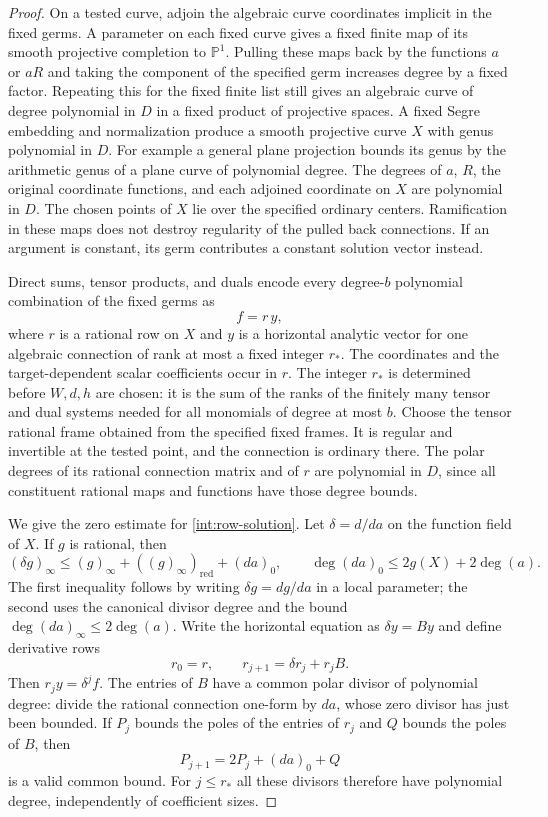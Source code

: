 \begin{proof}
On a tested curve, adjoin the algebraic curve coordinates implicit in
the fixed germs.  A parameter on each fixed curve gives a fixed finite
map of its smooth projective completion to $\mathbb P^1$.  Pulling
these maps back by the functions $a$ or $aR$ and taking the component
of the specified germ increases degree by a fixed factor.  Repeating
this for the fixed finite list still gives an algebraic curve of degree
polynomial in $D$ in a fixed product of projective spaces.  A fixed
Segre embedding and normalization produce a smooth projective curve
$X$ with genus polynomial in $D$.  For example a general plane
projection bounds its genus by the arithmetic genus of a plane curve
of polynomial degree.  The degrees of $a$, $R$, the original coordinate
functions, and each adjoined coordinate on $X$ are polynomial in $D$.
The chosen points of $X$ lie over the specified ordinary centers.
Ramification in these maps does not destroy regularity of the pulled
back connections.  If an argument is constant, its germ contributes
a constant solution vector instead.

Direct sums, tensor products, and duals encode every degree-$b$
polynomial combination of the fixed germs as
\begin{equation}\label{int:row-solution}
 f=r\,y,
\end{equation}
where $r$ is a rational row on $X$ and $y$ is a horizontal analytic
vector for one algebraic connection of rank at most a fixed integer
$r_*$.  The coordinates and the target-dependent scalar coefficients
occur in $r$.  The integer $r_*$ is determined before $W,d,h$ are chosen:
it is the sum of the ranks of the finitely many tensor and dual systems
needed for all monomials of degree at most $b$.  Choose the tensor
rational frame obtained from the specified fixed frames.  It is regular
and invertible at the tested point, and the connection is ordinary
there.  The polar degrees of its rational connection matrix and of $r$
are polynomial in $D$, since all constituent rational maps and
functions have those degree bounds.

We give the zero estimate for \eqref{int:row-solution}.  Let
$\delta=d/da$ on the function field of $X$.  If $g$ is rational, then
\[
 (\delta g)_\infty
  \leq (g)_\infty+((g)_\infty)_{\mathrm{red}}+(da)_0,
 \qquad
 \deg(da)_0\leq 2g(X)+2\deg(a).
\]
The first inequality follows by writing $\delta g=dg/da$ in a local
parameter; the second uses the canonical divisor degree and the bound
$\deg(da)_\infty\leq2\deg(a)$.  Write the horizontal equation as
$\delta y=B y$ and define derivative rows
\[
 r_0=r,\qquad r_{j+1}=\delta r_j+r_jB.
\]
Then $r_jy=\delta^jf$.  The entries of $B$ have a common polar divisor
of polynomial degree: divide the rational connection one-form by
$da$, whose zero divisor has just been bounded.  If $P_j$ bounds the
poles of the entries of $r_j$ and $Q$ bounds the poles of $B$, then
\[
 P_{j+1}=2P_j+(da)_0+Q
\]
is a valid common bound.  For $j\leq r_*$ all these divisors therefore
have polynomial degree, independently of coefficient sizes.


\end{proof}
